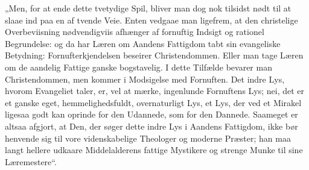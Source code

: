 \documentclass[12pt,a4paper]{book}
\begin{document}
„Men, for at ende dette tvetydige Spil, bliver man dog nok tilsidst nødt til at slaae
ind paa en af tvende Veie. Enten vedgaae man ligefrem, at den christelige
Overbeviisning nødvendigviis afhænger af fornuftig Indsigt og rationel Begrundelse: og
da har Læren om Aandens Fattigdom tabt sin evangeliske Betydning: Fornufterkjendelsen
beseirer Christendommen. Eller man tage Læren om de aandelig Fattige ganske
bogstavelig. I dette Tilfælde bevarer man Christendommen, men kommer i Modsigelse med
Fornuften. Det indre Lys, hvorom Evangeliet taler, er, vel at mærke, ingenlunde
Fornuftens Lys; nei, det er et ganske eget, hemmelighedsfuldt, overnaturligt Lys, et
Lys, der ved et Mirakel ligesaa godt kan oprinde for den Udannede, som for den Dannede.
Saameget er altsaa afgjort, at Den, der søger dette indre Lys i Aandens Fattigdom, ikke
bør henvende sig til vore videnskabelige Theologer og moderne Præster; han maa langt
hellere udkaare Middelalderens fattige Mystikere og strenge Munke til sine Læremestere“.
\end{document}
